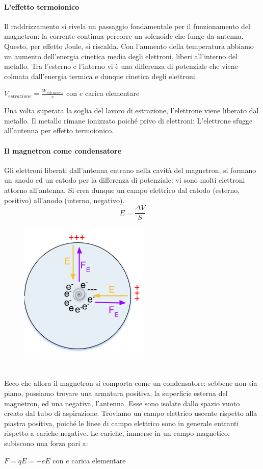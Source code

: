 \documentclass{article}
\begin{document}
\paragraph{L'effetto termoionico} Il raddrizzamento si rivela un passaggio fondamentale per il funzionamento del magnetron: la corrente continua percorre un solenoide che funge da antenna. Questo, per effetto Joule, si riscalda. Con l'aumento della temperatura abbiamo un aumento dell'energia cinetica media degli elettroni, liberi all'interno del metallo. Tra l'esterno e l'interno vi è una differenza di potenziale che viene colmata dall'energia termica e dunque cinetica degli elettroni. 
\begin{center}
$V_{estrazione} = \frac{W_{estrazione}}{e}$ con $e$ carica elementare
\end{center}
Una volta superata la soglia del lavoro di estrazione, l'elettrone viene liberato dal metallo. Il metallo rimane  ionizzato poiché privo di elettroni: L'elettrone sfugge all'antenna per effetto termoionico.
\paragraph{Il magnetron come condensatore}
Gli elettroni liberati dall'antenna entrano nella cavità del magnetron, si formano un anodo ed un catodo per la differenza di potenziale: vi sono molti elettroni attorno all'antenna. Si crea dunque un campo elettrico dal catodo (esterno, positivo) all'anodo (interno, negativo). 
 \[ E =  \frac{\Delta V}{S}\]
 \vspace*{-0.25in}
\begin{figure}[h]
\centering
\includegraphics[scale=0.36
]{6.png}
\label{fig: cubed graph}
\end{figure}\\
Ecco che allora il magnetron si comporta come un condensatore: sebbene non sia piano, possiamo trovare una armatura positiva, la superficie esterna del magnetron, ed una negativa, l'antenna. Esse sono isolate dallo spazio vuoto creato dal tubo di aspirazione. Troviamo un campo elettrico  uscente rispetto alla piastra positiva, poiché le linee di campo elettrico sono in generale entranti rispetto a cariche negative. Le cariche, immerse in un campo magnetico, subiscono una forza pari a:  
\begin{center}
$ F= q E = -e E$ con $e$ carica elementare    
\end{center}
\end{document}
